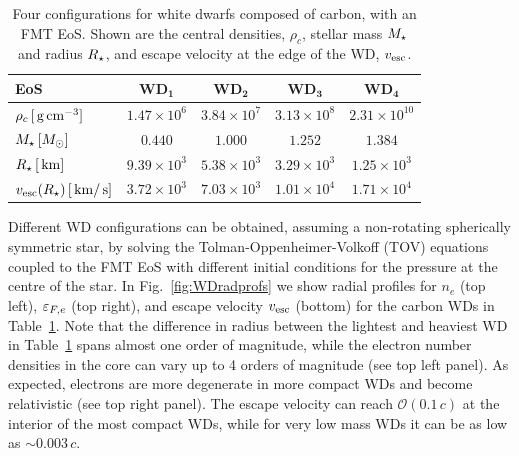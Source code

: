 \begin{table}[t]
  \centering
    \begin{tabular}{ l c c c c}
    \toprule
      \textbf{EoS} & \textbf{WD}$_\mathbf{1}$  & \textbf{WD}$_\mathbf{2}$&\textbf{WD}$_\mathbf{3}$ &\textbf{WD}$_\mathbf{4}$\\
      \midrule\midrule
     $\rho_c\,[{\rm \,g}{\rm \,cm}^{-3}]$ &  $1.47\times 10^{6}$ & $3.84\times 10^{7} $ & $3.13\times 10^{8}$ & $2.31\times 10^{10}$\\
     $M_\star\,[M_\odot]$ & $0.440$ &  $1.000 $ & $1.252$ & $1.384$\\
     $R_\star\,[{\rm \,km}]$ & $9.39\times 10^{3}$ &  $5.38\times 10^{3}$ & $3.29\times 10^3$ & $1.25\times 10^3$\\
     $v_\mathrm{esc}(R_\star) \, [{\rm \,km}/{\rm \,s}]$ & $3.72\times 10^{3}$ & $7.03\times 10^{3}$ & $1.01\times 10^{4}$ & $1.71\times 10^{4}$ \\
      \bottomrule
    \end{tabular}
  \caption{Four configurations for white dwarfs composed of carbon, with an FMT EoS. Shown are the central densities, $\rho_c$, stellar mass $M_\star$ and radius $R_\star$, and escape velocity at the edge of the WD, $v_\mathrm{esc}$. }
    \label{tab:WDs}
\end{table}
 


Different WD configurations can be obtained, assuming a non-rotating spherically symmetric star, by solving the
Tolman-Oppenheimer-Volkoff (TOV) equations~\cite{Tolman:1939jz_StaticSolutionsEinstein,Oppenheimer:1939ne_MassiveNeutronCores} coupled to the FMT EoS with different initial conditions for the pressure at the centre of the star. In Fig.~\ref{fig:WDradprofs} we show radial profiles for $n_e$ (top left), $\varepsilon_{F,e}$ (top right), and escape velocity $v_\mathrm{esc}$ (bottom) for the carbon WDs in Table~\ref{tab:WDs}. Note that the difference in radius between the lightest and heaviest WD in Table~\ref{tab:WDs} spans almost one order of magnitude, while the electron number densities in the core can vary up to 4 orders of magnitude (see top left panel). As expected, electrons are more degenerate in more compact WDs and become relativistic (see top right panel). The escape velocity can reach ${\mathcal{O}}(0.1\,c)$ at the interior of the most compact WDs, while for very low mass WDs 
it can be as low as $\sim0.003\,c$. 


